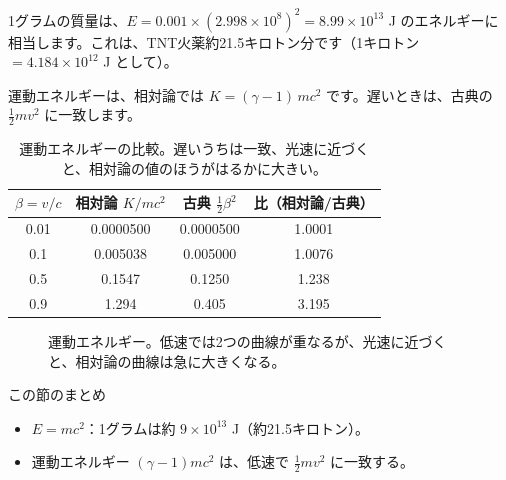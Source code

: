 \documentclass[a4paper,11pt,openany]{ltjsbook}
\begin{document}
1グラムの質量は、$E=0.001\times(2.998\times10^8)^2=8.99\times10^{13}$ J のエネルギーに相当します。これは、TNT火薬約21.5キロトン分です（1キロトン $=4.184\times10^{12}$ J として）。

運動エネルギーは、相対論では $K=(\gamma-1)\,mc^2$ です。遅いときは、古典の $\tfrac12mv^2$ に一致します。

\begin{table}[htbp]
\centering
\begin{tabular}{c|ccc}
\toprule
$\beta=v/c$ & 相対論 $K/mc^2$ & 古典 $\tfrac12\beta^2$ & 比（相対論/古典）\\
\midrule
0.01 & 0.0000500 & 0.0000500 & 1.0001\\
0.1 & 0.005038 & 0.005000 & 1.0076\\
0.5 & 0.1547 & 0.1250 & 1.238\\
0.9 & 1.294 & 0.405 & 3.195\\
\bottomrule
\end{tabular}
\caption{運動エネルギーの比較。遅いうちは一致、光速に近づくと、相対論の値のほうがはるかに大きい。}
\end{table}

\begin{figure}[htbp]
\centering
{}
\caption{運動エネルギー。低速では2つの曲線が重なるが、光速に近づくと、相対論の曲線は急に大きくなる。}
\end{figure}

\begin{pointbox}{この節のまとめ}
\begin{itemize}[leftmargin=*]
\item $E=mc^2$：1グラムは約 $9\times10^{13}$ J（約21.5キロトン）。
\item 運動エネルギー $(\gamma-1)mc^2$ は、低速で $\tfrac12mv^2$ に一致する。
\end{itemize}
\end{pointbox}
\end{document}
